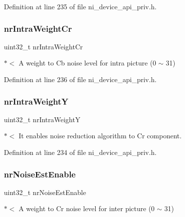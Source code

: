 Definition at line 235 of file ni\+\_\+device\+\_\+api\+\_\+priv.\+h.

\mbox{\label{struct__ni__t408__config__t_a2d292036b89b683d075e6b729abbc47f}} 
\subsubsection{\texorpdfstring{nrIntraWeightCr}{nrIntraWeightCr}}
{\footnotesize\ttfamily uint32\+\_\+t nr\+Intra\+Weight\+Cr}

$\ast$$<$ A weight to Cb noise level for intra picture (0 $\sim$ 31) 

Definition at line 236 of file ni\+\_\+device\+\_\+api\+\_\+priv.\+h.

\mbox{\label{struct__ni__t408__config__t_ac74e34b49c74dc5c5b039df43a2d6fff}} 
\subsubsection{\texorpdfstring{nrIntraWeightY}{nrIntraWeightY}}
{\footnotesize\ttfamily uint32\+\_\+t nr\+Intra\+WeightY}

$\ast$$<$ It enables noise reduction algorithm to Cr component. 

Definition at line 234 of file ni\+\_\+device\+\_\+api\+\_\+priv.\+h.

\mbox{\label{struct__ni__t408__config__t_a7bac97c4d1967ed8c31034e3c402e31f}} 
\subsubsection{\texorpdfstring{nrNoiseEstEnable}{nrNoiseEstEnable}}
{\footnotesize\ttfamily uint32\+\_\+t nr\+Noise\+Est\+Enable}

$\ast$$<$ A weight to Cr noise level for inter picture (0 $\sim$ 31) 

